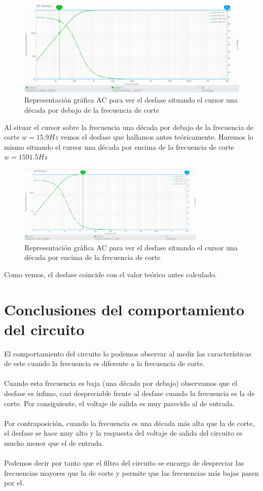 \documentclass[11pt,letterpaper]{article}
\begin{document}
\begin{figure}[H]
	\centering
	\includegraphics[width=1\textwidth]{imagen/decadaabajoac.png}
	\caption{Representación gráfica AC para ver el desfase situando el cursor una década por debajo de la frecuencia de corte}
	\label{fig:imagen-accorte-png}
\end{figure}
Al situar el cursor sobre la frecuencia una década por debajo de la frecuencia de corte $w=15.9 Hz$ vemos el desfase que hallamos antes teóricamente. Haremos lo mismo situando el cursor una década por encima de la frecuencia de corte  $w=1591.5 Hz$

\begin{figure}[H]
	\centering
	\includegraphics[width=0.8\textwidth]{imagen/decadaarribaac.png}
	\caption{Representación gráfica AC para ver el desfase situando el cursor una década por encima de la frecuencia de corte}
	\label{f}
\end{figure}

Como vemos, el desfase coincide con el valor teórico antes calculado. 
\section{Conclusiones del comportamiento del circuito}%
\label{sec:Conclusiones del comportamiento del circuito}
El comportamiento del circuito lo podemos observar al medir las características de este cuando la frecuencia es diferente a la frecuencia de corte. \\
\\
Cuando esta frecuencia es baja (una década por debajo) observamos que el desfase es ínfimo, casi despreciable frente al desfase cuando la frecuencia es la de corte. Por consiguiente, el voltaje de salida es muy parecido al de entrada.\\
\\
Por contraposición, cuando la frecuencia es una década más alta que la de corte, el desfase se hace muy alto y la respuesta del voltaje de salida del circuito es mucho menor que el de entrada.\\
\\
Podemos decir por tanto que el filtro del circuito se encarga de despreciar las frecuencias mayores que la de corte y permite que las frecuencias más bajas pasen por el. 
\end{document}
